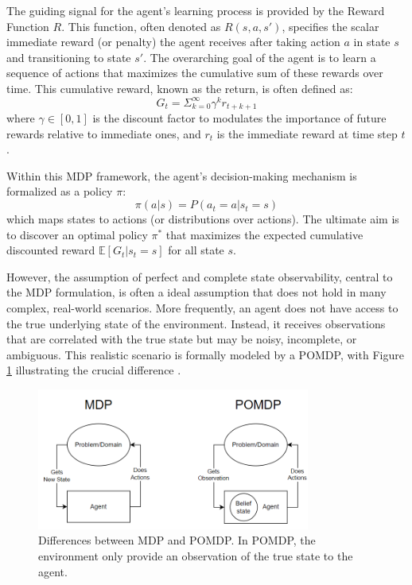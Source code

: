 The guiding signal for the agent's learning process is provided by the Reward Function \(R\). This function, often denoted as \(R(s, a, s')\), specifies the scalar immediate reward (or penalty) the agent receives after taking action \(a\) in state \(s\) and transitioning to state \(s'\). The overarching goal of the agent is to learn a sequence of actions that maximizes the cumulative sum of these rewards over time. This cumulative reward, known as the return, is often defined as:
\[G_t = \Sigma_{k=0}^\infty \gamma^k r_{t+k+1}\]
where \(\gamma \in [0,1]\) is the discount factor to modulates the importance of future rewards relative to immediate ones, and \(r_t\) is the immediate reward at time step \(t\).

Within this MDP framework, the agent's decision-making mechanism is formalized as a policy \(\pi\):
\[\pi(a|s) = P(a_t = a | s_t = s)\] 
which maps states to actions (or distributions over actions). The ultimate aim is to discover an optimal policy \(\pi^*\) that maximizes the expected cumulative discounted reward \(\mathbb{E}[G_t | s_t = s]\) for all state \(s\).

However, the assumption of perfect and complete state observability, central to the \gls{MDP} formulation, is often a ideal assumption that does not hold in many complex, real-world scenarios. More frequently, an agent does not have access to the true underlying state of the environment. Instead, it receives observations that are correlated with the true state but may be noisy, incomplete, or ambiguous. This realistic scenario is formally modeled by a \gls{POMDP}, with Figure \ref{fig:MDP_POMDP} illustrating the crucial difference \cite{Blumenthal2024}.

\begin{figure}
  \centering
    \includegraphics[width=0.8\textwidth]{images/MDP_POMDP_comparison.png}
    \caption{Differences between MDP and POMDP. In POMDP, the environment only provide an observation of the true state to the agent.}
    \label{fig:MDP_POMDP}
\end{figure}

